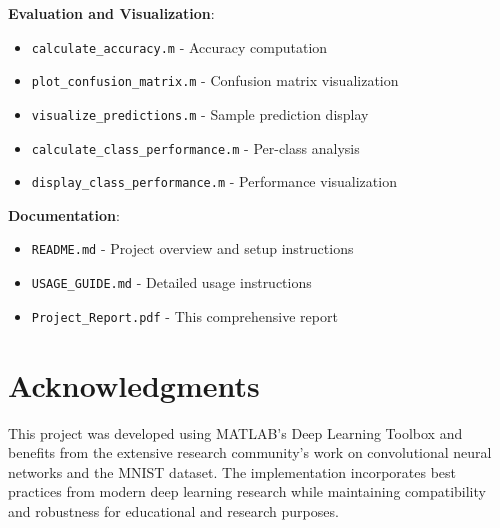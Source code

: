\documentclass[12pt,a4paper]{article}
\begin{document}
\textbf{Evaluation and Visualization}:
\begin{itemize}
    \item \texttt{calculate\_accuracy.m} - Accuracy computation
    \item \texttt{plot\_confusion\_matrix.m} - Confusion matrix visualization
    \item \texttt{visualize\_predictions.m} - Sample prediction display
    \item \texttt{calculate\_class\_performance.m} - Per-class analysis
    \item \texttt{display\_class\_performance.m} - Performance visualization
\end{itemize}

\textbf{Documentation}:
\begin{itemize}
    \item \texttt{README.md} - Project overview and setup instructions
    \item \texttt{USAGE\_GUIDE.md} - Detailed usage instructions
    \item \texttt{Project\_Report.pdf} - This comprehensive report
\end{itemize}

\section{Acknowledgments}

This project was developed using MATLAB's Deep Learning Toolbox and benefits from the extensive research community's work on convolutional neural networks and the MNIST dataset. The implementation incorporates best practices from modern deep learning research while maintaining compatibility and robustness for educational and research purposes.
\end{document}
